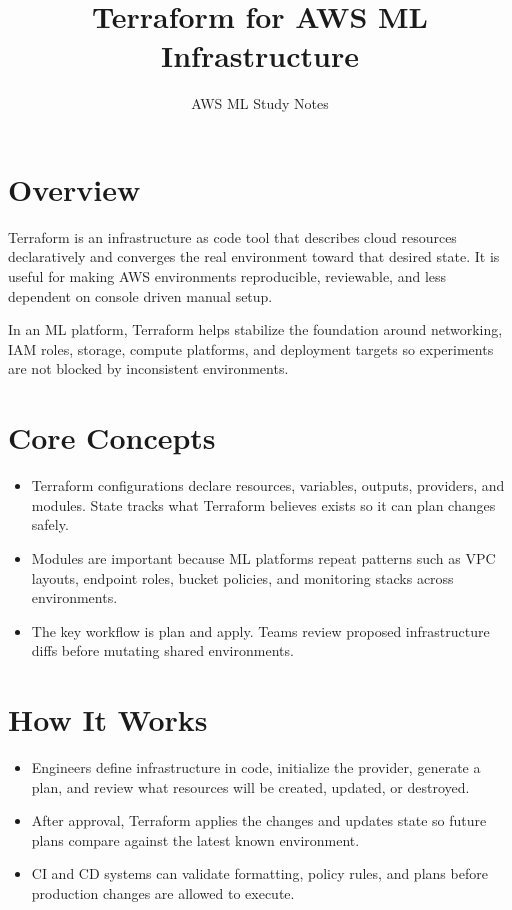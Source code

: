 \documentclass[10pt,twocolumn]{article}
\begin{document}
\title{\vspace{-1.6cm}Terraform for AWS ML Infrastructure}
\author{AWS ML Study Notes}
\date{}
\maketitle
\small

\section*{Overview}
Terraform is an infrastructure as code tool that describes cloud resources declaratively and converges the real environment toward that desired state. It is useful for making AWS environments reproducible, reviewable, and less dependent on console driven manual setup.

In an ML platform, Terraform helps stabilize the foundation around networking, IAM roles, storage, compute platforms, and deployment targets so experiments are not blocked by inconsistent environments.

\section*{Core Concepts}
\begin{itemize}
\item Terraform configurations declare resources, variables, outputs, providers, and modules. State tracks what Terraform believes exists so it can plan changes safely.
\item Modules are important because ML platforms repeat patterns such as VPC layouts, endpoint roles, bucket policies, and monitoring stacks across environments.
\item The key workflow is plan and apply. Teams review proposed infrastructure diffs before mutating shared environments.
\end{itemize}

\section*{How It Works}
\begin{itemize}
\item Engineers define infrastructure in code, initialize the provider, generate a plan, and review what resources will be created, updated, or destroyed.
\item After approval, Terraform applies the changes and updates state so future plans compare against the latest known environment.
\item CI and CD systems can validate formatting, policy rules, and plans before production changes are allowed to execute.
\end{itemize}
\end{document}
